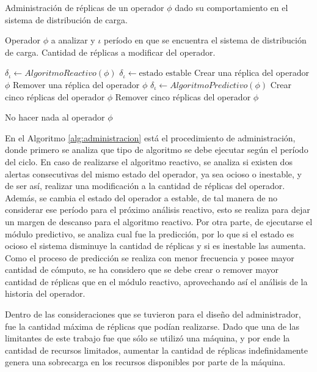 \begin{algorithm}[!ht]
	\caption{Administración de réplicas de un operador $\phi$ dado su comportamiento en el sistema de distribución de carga.}
	\label{alg:administracion}
	\begin{algorithmic}[1]
	\REQUIRE Operador $\phi$ a analizar y $\iota$ período en que se encuentra el sistema de distribución de carga.
	\ENSURE Cantidad de réplicas a modificar del operador.	
	
		\STATE $\delta_{\iota} \leftarrow AlgoritmoReactivo(\phi)$
				\STATE $\delta_{\iota} \leftarrow \text{estado estable}$ 
				\RETURN Crear una réplica del operador $\phi$
			\ENDIF
			\RETURN Remover una réplica del operador $\phi$
		\ENDIF 
	\ELSE
		\STATE $\delta_{\iota} \leftarrow AlgoritmoPredictivo(\phi)$
				\RETURN Crear cinco réplicas del operador $\phi$
			\ENDIF
			\RETURN Remover cinco réplicas del operador $\phi$
		\ENDIF
	\ENDIF
	
	\RETURN No hacer nada al operador $\phi$
	
	\end{algorithmic}
\end{algorithm}

En el Algoritmo \ref{alg:administracion} está el procedimiento de administración, donde primero se analiza que tipo de algoritmo se debe ejecutar según el período del ciclo. En caso de realizarse el algoritmo reactivo, se analiza si existen dos alertas consecutivas del mismo estado del operador, ya sea ocioso o inestable, y de ser así, realizar una modificación a la cantidad de réplicas del operador. Además, se cambia el estado del operador a estable, de tal manera de no considerar ese período para el próximo análisis reactivo, esto se realiza para dejar un margen de descanso para el algoritmo reactivo. Por otra parte, de ejecutarse el módulo predictivo, se analiza cual fue la predicción, por lo que si el estado es ocioso el sistema disminuye la cantidad de réplicas y si es inestable las aumenta. Como el proceso de predicción se realiza con menor frecuencia y posee mayor cantidad de cómputo, se ha considero que se debe crear o remover mayor cantidad de réplicas que en el módulo reactivo, aprovechando así el análisis de la historia del operador.

Dentro de las consideraciones que se tuvieron para el diseño del administrador, fue la cantidad máxima de réplicas que podían realizarse. Dado que una de las limitantes de este trabajo fue que sólo se utilizó una máquina, y por ende la cantidad de recursos limitados, aumentar la cantidad de réplicas indefinidamente genera una sobrecarga en los recursos disponibles por parte de la máquina.